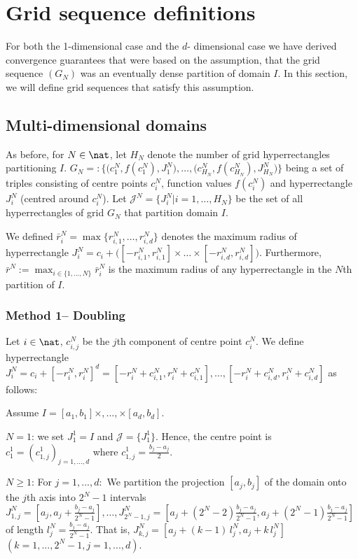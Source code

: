 \section{Grid sequence definitions}
For both the 1-dimensional case and the $d$- dimensional case we have derived convergence guarantees that were based on the assumption, that the grid sequence $(G_N)$ was an eventually dense partition of domain $I$. In this section, we will define grid sequences that satisfy this assumption.

\subsection{Multi-dimensional domains}

As before, for $N \in \nat$, let $H_N$ denote the number of grid hyperrectangles partitioning $I$. 
$G_N =: \{\bigl(c_1^N,f(c_1^N), J_1^N\bigr),\ldots,\bigl(c_{H_N}^N,f(c_{H_N}^{N}), J_{H_N}^{N}\bigr)\}$ being a set of triples consisting of centre points $c_i^N$, function values $f(c_i^N)$ and hyperrectangle $J_i^N$ (centred around $c_i^N$). 
Let $\mathcal J^N = \{ J_i^N | i=1,\ldots,H_N \} $ be the set of all hyperrectangles of grid $G_N$ that partition domain $I$.

We defined $\bar r_i^N = \max\{ r_{i,1}^N,\ldots, r_{i,d}^N\}$ denotes the maximum radius of hyperrectangle $J_i^N = c_i + \bigl([-r_{i,1}^N ,r_{i,1}^N ]\times \ldots \times [-r_{i,d}^N ,r_{i,d}^N ] \bigr)$. Furthermore, $\bar r^N := \max_{i \in \{1,...,N\}} \bar r_i^N$ is the maximum radius of any hyperrectangle in the $N$th partition of $I$.


\subsubsection{Method 1-- Doubling} 

Let $i \in \nat$, $c_{i,j}^N$ be the $j$th component of centre point $c_{i}^N$. We define hyperrectangle 
$J_i^N = c_i + [-r_i^N,r_i^N]^d =  [-r_i^N+c_{i,1}^N,r_i^N+c_{i,1}^N],\ldots,[-r_i^N+c_{i,d}^N,r_i^N+c_{i,d}^N] $ as follows:

Assume $I= [a_1,b_1] \times,...,\times [a_d,b_d]$.


$N=1$: we set $J^1_1 = I$ and $\mathcal J = \{J^1_1 \}$. Hence, the centre point is 
$c_1^1 = (c_{1,j}^1)_{j=1,...,d}$ where $c_{1,j}^1 = \frac{b_j-a_j}{2}$.

$N\geq 1$:  For $j=1,...,d:$ We partition the projection $[a_j,b_j]$ of the domain onto the $j$th axis into $2^N-1$ intervals $J_{1,j}^N = [a_j,a_j+ \frac{b_j-a_j}{2^N-1}],\ldots, J_{2^N-1,j}^N = [a_j+(2^N-2) \frac{b_j-a_j}{2^N-1},a_j+ (2^N-1) \frac{b_j-a_j}{2^N-1}] $ of length $l_{j}^N=\frac{b_j-a_j}{2^N-1}$.
That is, $J_{k,j}^N =[a_j + (k-1)\, l_j^N ,a_j+ k \, l_j^N]$ $(k=1,...,2^N-1, j=1,...,d)$.   

